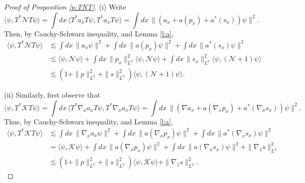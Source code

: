 \documentclass[11pt,a4paper]{scrartcl}
\newcommand{\N}{\mathcal{N}}
\newcommand{\K}{\mathcal{K}}
\begin{document}
\begin{proof}[Proof of Proposition \ref{p:TNT}]
  (i) Write
  \[
    \langle \psi, T^* \N T \psi \rangle = \int dx \, \langle T^* a_x T \psi,
    T^* a_x T \psi \rangle = \int dx \, \| (a_x + a(p_x) + a^*(s_x)) \psi
    \|^2.
  \]
  Then, by Cauchy-Schwarz inequality, and Lemma \ref{l:a},
  \begin{align*}
    \langle \psi, T^* \N T \psi \rangle & \apprle \int dx \, \| a_x \psi \|^2
    + \int dx \, \| a(p_x) \psi \|^2 + \int dx \, \| a^*(s_x) \psi \|^2 \\
    & \apprle \langle \psi, \N \psi \rangle + \int dx \, \| p_x \|_{L^2}^2
    \langle \psi, \N \psi \rangle + \int dx \, \| s_x \|_{L^2}^2 \langle
    \psi, (\N+1) \psi \rangle \\
    & \apprle (1 + \| p \|_{L^2}^2 + \| s \|_{L^2}^2) \langle \psi, (\N+1) \psi
    \rangle.
  \end{align*}


  (ii) Similarly, first observe that
  \[
    \langle \psi, T^* \K T \psi \rangle = \int dx \, \langle T^* \nabla_x a_x
    T \psi, T^* \nabla_x a_x T \psi \rangle = \int dx \, \| (\nabla a_x +
    a(\nabla_x p_x) + a^*(\nabla_x s_x)) \psi \|^2.
  \]
  Thus, by Cauchy-Schwarz inequality, and Lemma \ref{l:a},
  \begin{align*}
    \langle \psi, T^* \K T \psi \rangle & \apprle \int dx \, \| \nabla_x a_x
    \psi \|^2 + \int dx \, \| a(\nabla_x p_x) \psi \|^2 + \int dx \, \|
    a^*(\nabla_x s_x) \psi \|^2 \\
    & = \langle \psi, \K \psi \rangle + \int dx \, \| a(\nabla_x p_x) \psi
    \|^2 + \int dx \, \| a(\nabla_x s_x) \psi \|^2 + \| \nabla_1 s \|_{L^2}^2
    \\
    & \apprle (1 + \| p \|_{L^2}^2 + \| s \|_{L^2}^2) \langle \psi, \K \psi
    \rangle + \| \nabla_1 s \|_{L^2}^2.
  \end{align*}



\end{proof}
\end{document}
